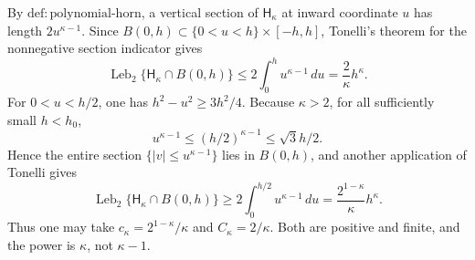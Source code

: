 By \(\mathrm{def:polynomial\text{-}horn}\), a vertical section of \(\mathsf H_{\kappa}\) at inward coordinate \(u\) has length \(2u^{\kappa-1}\). Since \(B(0,h)\subset\{0<u<h\}\times[-h,h]\), Tonelli's theorem for the nonnegative section indicator gives
\[
 \operatorname{Leb}_2\{\mathsf H_{\kappa}\cap B(0,h)\}
 \le 2\int_0^h u^{\kappa-1}\,du
 =\frac{2}{\kappa}h^{\kappa}.
\]
For \(0<u<h/2\), one has \(h^2-u^2\ge3h^2/4\). Because \(\kappa>2\), for all sufficiently small \(h<h_0\),
\[
 u^{\kappa-1}\le(h/2)^{\kappa-1}\le \sqrt{3}h/2.
\]
Hence the entire section \(\{|v|\le u^{\kappa-1}\}\) lies in \(B(0,h)\), and another application of Tonelli gives
\[
 \operatorname{Leb}_2\{\mathsf H_{\kappa}\cap B(0,h)\}
 \ge 2\int_0^{h/2}u^{\kappa-1}\,du
 =\frac{2^{1-\kappa}}{\kappa}h^{\kappa}.
\]
Thus one may take \(c_{\kappa}=2^{1-\kappa}/\kappa\) and \(C_{\kappa}=2/\kappa\). Both are positive and finite, and the power is \(\kappa\), not \(\kappa-1\).
